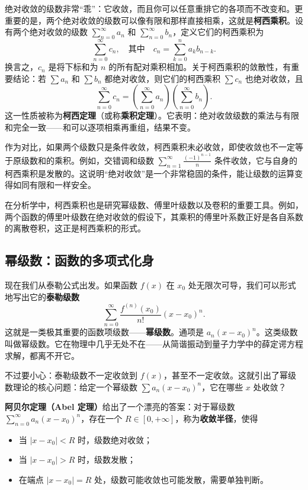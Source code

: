 \documentclass[UTF8]{ctexbook}
\begin{document}
绝对收敛的级数非常“乖”：它收敛，而且你可以任意重排它的各项而不改变和。更重要的是，两个绝对收敛的级数可以像有限和那样直接相乘，这就是\textbf{柯西乘积}。设有两个绝对收敛的级数 $\sum_{n=0}^{\infty} a_n$ 和 $\sum_{n=0}^{\infty} b_n$，定义它们的柯西乘积为
\[
\sum_{n=0}^{\infty} c_n, \quad \text{其中} \quad c_n = \sum_{k=0}^{n} a_k b_{n-k}.
\]
换言之，$c_n$ 是将下标和为 $n$ 的所有配对乘积相加。关于柯西乘积的敛散性，有重要结论：若 $\sum a_n$ 和 $\sum b_n$ 都绝对收敛，则它们的柯西乘积 $\sum c_n$ 也绝对收敛，且
\[
\sum_{n=0}^{\infty} c_n = \left( \sum_{n=0}^{\infty} a_n \right) \left( \sum_{n=0}^{\infty} b_n \right).
\]
这一性质被称为\textbf{柯西定理}（或称\textbf{乘积定理}）。它表明：绝对收敛级数的乘法与有限和完全一致——和可以逐项相乘再重组，结果不变。

作为对比，如果两个级数只是条件收敛，柯西乘积未必收敛，即使收敛也不一定等于原级数和的乘积。例如，交错调和级数 $\sum_{n=1}^{\infty} \frac{(-1)^{n-1}}{n}$ 条件收敛，它与自身的柯西乘积是发散的。这说明“绝对收敛”是一个非常稳固的条件，能让级数的运算变得如同有限和一样安全。

在分析学中，柯西乘积也是研究幂级数、傅里叶级数以及卷积的重要工具。例如，两个函数的傅里叶级数在绝对收敛的假设下，其乘积的傅里叶系数正好是各自系数的离散卷积，这正是柯西乘积的形式。

\subsection{幂级数：函数的多项式化身}

现在我们从泰勒公式出发。如果函数 $f(x)$ 在 $x_0$ 处无限次可导，我们可以形式地写出它的\textbf{泰勒级数}
\[
\sum_{n=0}^{\infty} \frac{f^{(n)}(x_0)}{n!} (x-x_0)^n.
\]
这就是一类极其重要的函数项级数——\textbf{幂级数}。通项是 $a_n (x-x_0)^n$。这类级数叫做幂级数。它在物理中几乎无处不在——从简谐振动到量子力学中的薛定谔方程求解，都离不开它。

不过要小心：泰勒级数不一定收敛到 $f(x)$，甚至不一定收敛。这就引出了幂级数理论的核心问题：给定一个幂级数 $\sum a_n (x-x_0)^n$，它在哪些 $x$ 处收敛？

\textbf{阿贝尔定理（Abel 定理）}给出了一个漂亮的答案：对于幂级数 $\sum_{n=0}^{\infty} a_n (x-x_0)^n$，存在一个 $R \in [0, +\infty]$，称为\textbf{收敛半径}，使得
\begin{itemize}
    \item 当 $|x-x_0| < R$ 时，级数绝对收敛；
    \item 当 $|x-x_0| > R$ 时，级数发散；
    \item 在端点 $|x-x_0| = R$ 处，级数可能收敛也可能发散，需要单独判断。
\end{itemize}
\end{document}
